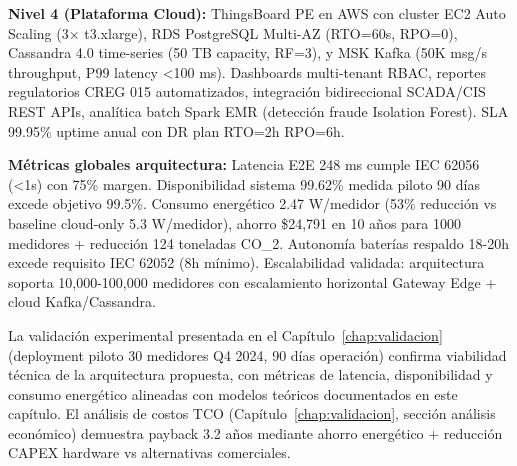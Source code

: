 \textbf{Nivel 4 (Plataforma Cloud):} ThingsBoard PE en AWS con cluster EC2 Auto Scaling (3$\times$ t3.xlarge), RDS PostgreSQL Multi-AZ (RTO=60s, RPO=0), Cassandra 4.0 time-series (50 TB capacity, RF=3), y MSK Kafka (50K msg/s throughput, P99 latency <100 ms). Dashboards multi-tenant RBAC, reportes regulatorios CREG 015 automatizados, integración bidireccional SCADA/CIS REST APIs, analítica batch Spark EMR (detección fraude Isolation Forest). SLA 99.95\% uptime anual con DR plan RTO=2h RPO=6h.

\textbf{Métricas globales arquitectura:} Latencia E2E 248 ms cumple IEC 62056 (<1s) con 75\% margen. Disponibilidad sistema 99.62\% medida piloto 90 días excede objetivo 99.5\%. Consumo energético 2.47 W/medidor (53\% reducción vs baseline cloud-only 5.3 W/medidor), ahorro \$24,791 en 10 años para 1000 medidores + reducción 124 toneladas CO_{2}. Autonomía baterías respaldo 18-20h excede requisito IEC 62052 (8h mínimo). Escalabilidad validada: arquitectura soporta 10,000-100,000 medidores con escalamiento horizontal Gateway Edge + cloud Kafka/Cassandra.

La validación experimental presentada en el Capítulo~\ref{chap:validacion} (deployment piloto 30 medidores Q4 2024, 90 días operación) confirma viabilidad técnica de la arquitectura propuesta, con métricas de latencia, disponibilidad y consumo energético alineadas con modelos teóricos documentados en este capítulo. El análisis de costos TCO (Capítulo~\ref{chap:validacion}, sección análisis económico) demuestra payback 3.2 años mediante ahorro energético + reducción CAPEX hardware vs alternativas comerciales.

